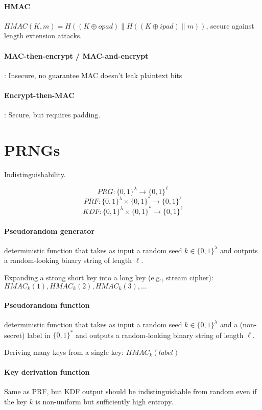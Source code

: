 \documentclass[11pt]{article}
\begin{document}
\paragraph{HMAC} $HMAC(K, m) = H((K \oplus opad) \parallel H((K \oplus ipad) \parallel m))$, secure against length extension attacks.

\paragraph{MAC-then-encrypt / MAC-and-encrypt}: Insecure, no guarantee MAC doesn't leak plaintext bits

\paragraph{Encrypt-then-MAC}: Secure, but requires padding.

\section{PRNGs} Indistinguishability.

$$PRG : \{0, 1\}^\lambda \to \{0, 1\}^\ell$$
$$PRF : \{0, 1\}^\lambda \times \{0, 1\}^* \to \{0, 1\}^\ell$$
$$KDF : \{0, 1\}^\lambda \times \{0, 1\}^* \to \{0, 1\}^\ell$$

\paragraph{Pseudorandom generator} deterministic function that takes as input a random seed $k \in \{0, 1\}^\lambda$ and outputs a random-looking binary string of length $\ell$.

Expanding a strong short key into a long key (e.g., stream cipher): $HMAC_k(1), HMAC_k(2), HMAC_k(3), \ldots$

\paragraph{Pseudorandom function} deterministic function that takes as input a random seed $k \in \{0, 1\}^\lambda$ and a (non-secret) label in $\{0, 1\}^*$ and outputs a random-looking binary string of length $\ell$.

Deriving many keys from a single key: $HMAC_k(label)$

\paragraph{Key derivation function} Same as PRF, but KDF output should be indistinguishable from random even if the key $k$ is non-uniform but sufficiently high entropy.
\end{document}
